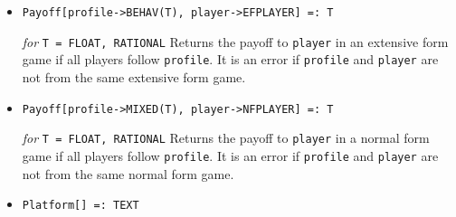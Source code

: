 \begin{itemize}




\item{}
\protect \large \begin{verbatim}
Payoff[profile->BEHAV(T), player->EFPLAYER] =: T
\end{verbatim}\normalsize

{\it for} {\tt T = FLOAT, RATIONAL}
\bd
Returns the payoff to \verb+player+ in an extensive form game if all
players follow \verb+profile+.  It is an error if \verb+profile+
and \verb+player+ are not from the same extensive form game.
\ed

\item{}
\protect \large \begin{verbatim}
Payoff[profile->MIXED(T), player->NFPLAYER] =: T
\end{verbatim}\normalsize

{\it for} {\tt T = FLOAT, RATIONAL}
\bd
Returns the payoff to \verb+player+ in a normal form game if all players
follow \verb+profile+.  It is an error if \verb+profile+ and \verb+player+
are not from the same normal form game.
\ed

\item{}
\protect \large \begin{verbatim}
Platform[] =: TEXT
\end{verbatim} \normalsize


\end{itemize}
